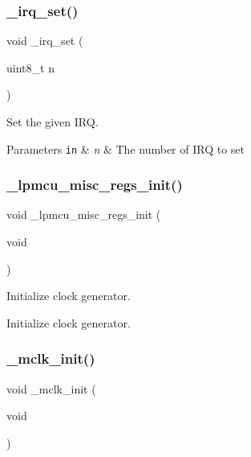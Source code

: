 \subsubsection{\texorpdfstring{\+\_\+irq\+\_\+set()}{\_irq\_set()}}
{\footnotesize\ttfamily void \+\_\+irq\+\_\+set (\begin{DoxyParamCaption}\item[{uint8\+\_\+t}]{n }\end{DoxyParamCaption})}



Set the given I\+RQ. 


\begin{DoxyParams}[1]{Parameters}
\mbox{\tt in}  & {\em n} & The number of I\+RQ to set \\
\hline
\end{DoxyParams}
\mbox{\label{group___h_p_l_ga3dd85007c9fdeed2ffe1166a33dd6519}} 
\subsubsection{\texorpdfstring{\+\_\+lpmcu\+\_\+misc\+\_\+regs\+\_\+init()}{\_lpmcu\_misc\_regs\_init()}}
{\footnotesize\ttfamily void \+\_\+lpmcu\+\_\+misc\+\_\+regs\+\_\+init (\begin{DoxyParamCaption}\item[{void}]{ }\end{DoxyParamCaption})}



Initialize clock generator. 

Initialize clock generator. \mbox{\label{group___h_p_l_ga840b5c5290dd94e858db4d89259ba3f4}} 
\subsubsection{\texorpdfstring{\+\_\+mclk\+\_\+init()}{\_mclk\_init()}}
{\footnotesize\ttfamily void \+\_\+mclk\+\_\+init (\begin{DoxyParamCaption}\item[{void}]{ }\end{DoxyParamCaption})}



